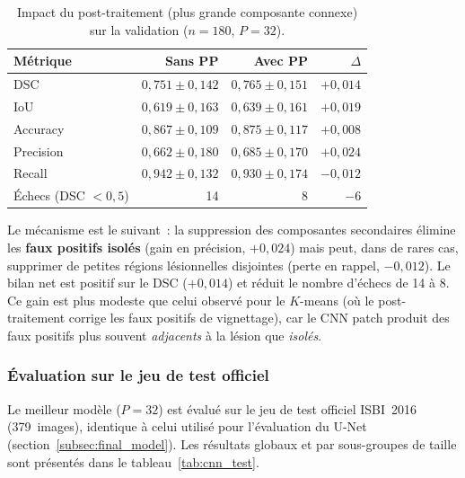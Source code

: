 \documentclass[12pt,a4paper]{article}
\begin{document}
\begin{table}[H]
\centering
\caption{Impact du post-traitement (plus grande composante connexe) sur la validation ($n = 180$, $P = 32$).}
\label{tab:cnn_pp}
\begin{tabular}{l r r r}
\toprule
\textbf{Métrique} & \textbf{Sans PP} & \textbf{Avec PP} & \textbf{$\Delta$} \\
\midrule
DSC       & $0{,}751 \pm 0{,}142$ & $0{,}765 \pm 0{,}151$ & $+0{,}014$ \\
IoU       & $0{,}619 \pm 0{,}163$ & $0{,}639 \pm 0{,}161$ & $+0{,}019$ \\
Accuracy  & $0{,}867 \pm 0{,}109$ & $0{,}875 \pm 0{,}117$ & $+0{,}008$ \\
Precision & $0{,}662 \pm 0{,}180$ & $0{,}685 \pm 0{,}170$ & $+0{,}024$ \\
Recall    & $0{,}942 \pm 0{,}132$ & $0{,}930 \pm 0{,}174$ & $-0{,}012$ \\
\midrule
Échecs (DSC $< 0{,}5$) & 14 & 8 & $-6$ \\
\bottomrule
\end{tabular}
\end{table}

Le mécanisme est le suivant~: la suppression des composantes secondaires élimine les \textbf{faux positifs isolés} (gain en précision, $+0{,}024$) mais peut, dans de rares cas, supprimer de petites régions lésionnelles disjointes (perte en rappel, $-0{,}012$). Le bilan net est positif sur le DSC ($+0{,}014$) et réduit le nombre d'échecs de 14 à 8. Ce gain est plus modeste que celui observé pour le $K$-means (où le post-traitement corrige les faux positifs de vignettage), car le CNN patch produit des faux positifs plus souvent \emph{adjacents} à la lésion que \emph{isolés}.

\subsubsection{Évaluation sur le jeu de test officiel}

Le meilleur modèle ($P = 32$) est évalué sur le jeu de test officiel ISBI~2016 (379~images), identique à celui utilisé pour l'évaluation du U-Net (section~\ref{subsec:final_model}). Les résultats globaux et par sous-groupes de taille sont présentés dans le tableau~\ref{tab:cnn_test}.
\end{document}
